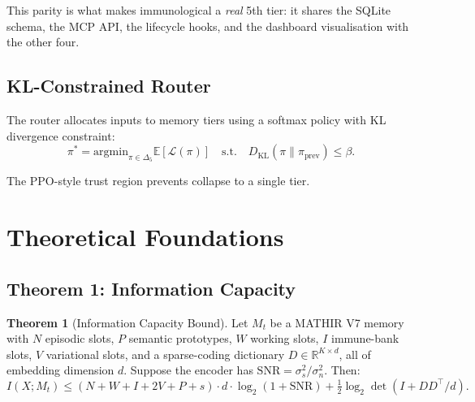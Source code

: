 \documentclass[12pt,a4paper]{article}
\theoremstyle{definition}
\newtheorem{theorem}{Theorem}[section]
\theoremstyle{remark}
\newcommand{\MATHIR}{\textsc{MATHIR}}
\newcommand{\R}{\mathbb{R}}
\newcommand{\E}{\mathbb{E}}
\newcommand{\KL}{D_{\mathrm{KL}}}
\newcommand{\argmin}{\mathrm{argmin}}
\newcommand{\SNR}{\mathrm{SNR}}
\begin{document}
This parity is what makes immunological a \emph{real} 5th tier: it shares the SQLite schema, the MCP API, the lifecycle hooks, and the dashboard visualisation with the other four.

\subsection{KL-Constrained Router}

The router allocates inputs to memory tiers using a softmax policy with KL divergence constraint:
\begin{equation}
    \pi^* = \argmin_{\pi \in \Delta_5} \E[\mathcal{L}(\pi)] \quad \text{s.t.} \quad \KL(\pi \| \pi_{\text{prev}}) \le \beta.
\end{equation}

The PPO-style trust region prevents collapse to a single tier.

\section{Theoretical Foundations}
\label{sec:theory}

\subsection{Theorem 1: Information Capacity}

\begin{theorem}[Information Capacity Bound]
\label{thm:capacity}
Let $M_t$ be a \MATHIR{} V7 memory with $N$ episodic slots, $P$ semantic prototypes, $W$ working slots, $I$ immune-bank slots, $V$ variational slots, and a sparse-coding dictionary $D \in \R^{K \times d}$, all of embedding dimension $d$. Suppose the encoder has $\SNR = \sigma_s^2 / \sigma_n^2$. Then:
\begin{equation}
    I(X; M_t) \le (N + W + I + 2V + P + s) \cdot d \cdot \log_2(1 + \SNR) + \tfrac{1}{2} \log_2 \det(I + D D^\top / d).
\end{equation}
\end{theorem}
\end{document}
